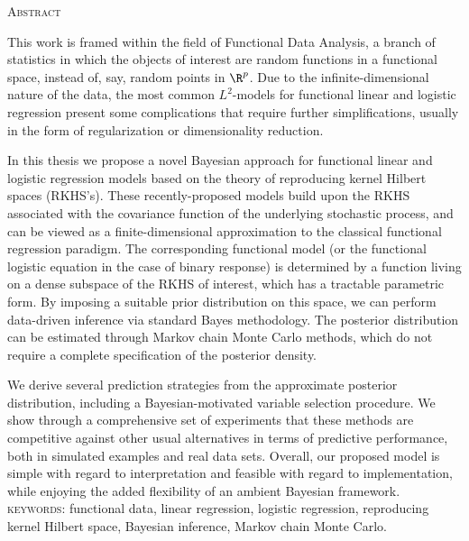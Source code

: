 %
%

\begin{center}
  \begin{Large}
  \textsc{Abstract}
\end{Large}
\end{center}

\noindent This work is framed within the field of Functional Data Analysis, a branch of statistics in which the objects of interest are random functions in a functional space, instead of, say, random points in \(\R^p\). Due to the infinite-dimensional nature of the data, the most common \(L^2\)-models for functional linear and logistic regression present some complications that require further simplifications, usually in the form of regularization or dimensionality reduction.

In this thesis we propose a novel Bayesian approach for functional linear and logistic regression models based on the theory of reproducing kernel Hilbert spaces (RKHS's). These recently-proposed models build upon the RKHS associated with the covariance function of the underlying stochastic process, and can be viewed as a finite-dimensional approximation to the classical functional regression paradigm. The corresponding functional model (or the functional logistic equation in the case of binary response) is determined by a function living on a dense subspace of the RKHS of interest, which has a tractable parametric form. By imposing a suitable prior distribution on this space, we can perform data-driven inference via standard Bayes methodology. The posterior distribution can be estimated through Markov chain Monte Carlo methods, which do not require a complete specification of the posterior density.

We derive several prediction strategies from the approximate posterior distribution, including a Bayesian-motivated variable selection procedure. We show through a comprehensive set of experiments that these methods are competitive against other usual alternatives in terms of predictive performance, both in simulated examples and real data sets. Overall, our proposed model is simple with regard to interpretation and feasible with regard to implementation, while enjoying the added flexibility of an ambient Bayesian framework.\\

\noindent
\textsc{keywords:} functional data, linear regression, logistic regression, reproducing kernel Hilbert space, Bayesian inference, Markov chain Monte Carlo.

